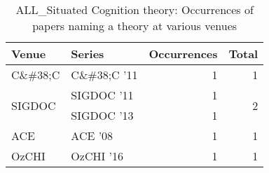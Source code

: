 \begin{table*}[t]
\begin{tabular}{llrr}
Venue & Series & Occurrences & Total\\\hline
\multirow{1}{*}{C\&\#38;C } & C\&\#38;C '11 & 1 & \multirow{1}{*}{1}\\
\multirow{2}{*}{SIGDOC } & SIGDOC '11 & 1 & \multirow{2}{*}{2}\\
& SIGDOC '13 & 1 &\\
\multirow{1}{*}{ACE } & ACE '08 & 1 & \multirow{1}{*}{1}\\
\multirow{1}{*}{OzCHI } & OzCHI '16 & 1 & \multirow{1}{*}{1}\\
\end{tabular}
\caption{ALL\_Situated Cognition theory: Occurrences of papers naming a theory at various venues}
\end{table*}